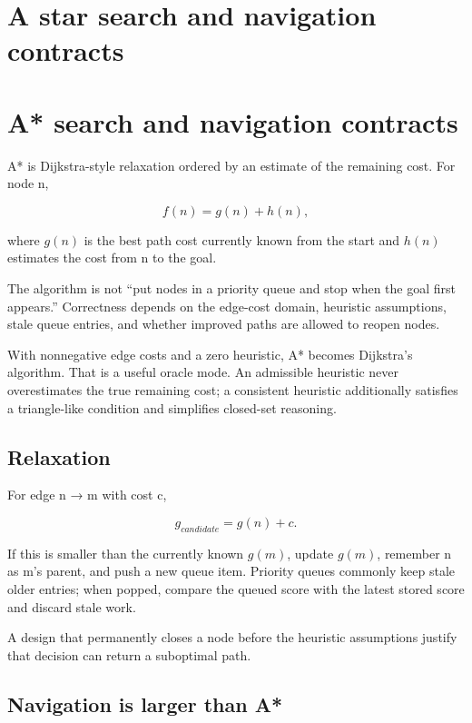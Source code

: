 \hypertarget{appendix-5803241aa1a5}{}
\section*{A star search and navigation contracts}
\section{A* search and navigation contracts}\label{a-search-and-navigation-contracts}

A* is Dijkstra-style relaxation ordered by an estimate of the remaining cost. For node n,

\[
f(n)=g(n)+h(n),
\]

where \(g(n)\) is the best path cost currently known from the start and \(h(n)\) estimates the cost from n to the goal.

The algorithm is not ``put nodes in a priority queue and stop when the goal first appears.'' Correctness depends on the edge-cost domain, heuristic assumptions, stale queue entries, and whether improved paths are allowed to reopen nodes.

With nonnegative edge costs and a zero heuristic, A* becomes Dijkstra's algorithm. That is a useful oracle mode. An admissible heuristic never overestimates the true remaining cost; a consistent heuristic additionally satisfies a triangle-like condition and simplifies closed-set reasoning.

\subsection{Relaxation}\label{relaxation}

For edge n → m with cost c,

\[
g_{candidate}=g(n)+c.
\]

If this is smaller than the currently known \(g(m)\), update \(g(m)\), remember n as m's parent, and push a new queue item. Priority queues commonly keep stale older entries; when popped, compare the queued score with the latest stored score and discard stale work.

A design that permanently closes a node before the heuristic assumptions justify that decision can return a suboptimal path.

\subsection{Navigation is larger than A*}\label{navigation-is-larger-than-a}

